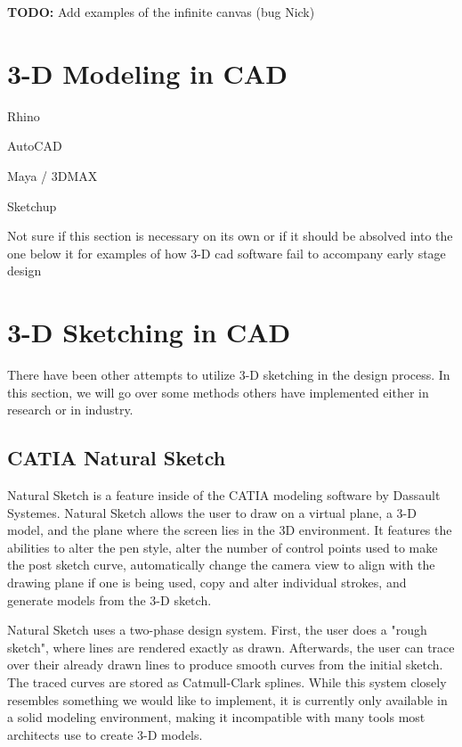 \documentclass[12pt]{report}
\begin{document}
\textbf{TODO:} Add examples of the infinite canvas (bug Nick)


\section{3-D Modeling in CAD}

Rhino

AutoCAD

Maya / 3DMAX

Sketchup

Not sure if this section is necessary on its own or if it should be absolved into the one below it for examples of how 3-D cad software fail to accompany early stage design

\section{3-D Sketching in CAD}

There have been other attempts to utilize 3-D sketching in the design process. In this section, we will go over some methods others have implemented either in research or in industry.

\subsection{CATIA Natural Sketch}

Natural Sketch is a feature inside of the CATIA modeling software by Dassault Systemes. 
Natural Sketch allows the user to draw on a virtual plane, a 3-D model, and the plane where the screen lies in the 3D environment. 
It features the abilities to alter the pen style, alter the number of control points used to make the post sketch curve, automatically change the camera view to align with the drawing plane if one is being used, copy and alter individual strokes, and generate models from the 3-D sketch.

Natural Sketch uses a two-phase design system. First, the user does a "rough sketch", where lines are rendered exactly as drawn. 
Afterwards, the user can trace over their already drawn lines to produce smooth curves from the initial sketch.
The traced curves are stored as Catmull-Clark splines.
While this system closely resembles something we would like to implement, it is currently only available in a solid modeling environment, making it incompatible with many tools most architects use to create 3-D models.
\end{document}
